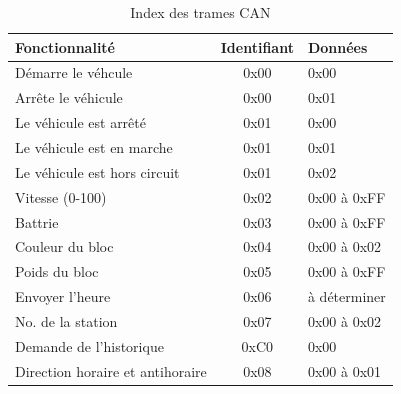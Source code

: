 \documentclass[10pt,a4paper,final]{article}
\begin{document}
\begin{spacing}{1.5}
\begin{table}[!ht]
\caption{Index des trames CAN}
\medskip
\centering
\begin{tabular}{|l|c|l|}
\hline 
\textbf{Fonctionnalité} & \textbf{Identifiant} & \textbf{Données} \\
\hline 
Démarre le véhcule & 0x00 & 0x00 \\ 
\hline 
Arrête le véhicule & 0x00 & 0x01 \\ 
\hline 
Le véhicule est arrêté & 0x01 & 0x00 \\ 
\hline 
Le véhicule est en marche& 0x01 & 0x01 \\ 
\hline 
Le véhicule est hors circuit & 0x01 & 0x02 \\ 
\hline 
Vitesse (0-100) & 0x02 & 0x00 à 0xFF \\ 
\hline 
Battrie & 0x03 & 0x00 à 0xFF \\ 
\hline 
Couleur du bloc & 0x04 & 0x00 à 0x02 \\ 
\hline 
Poids du bloc & 0x05 & 0x00 à 0xFF \\ 
\hline 
Envoyer l'heure & 0x06 & à déterminer \\ 
\hline 
No. de la station & 0x07 & 0x00 à 0x02 \\ 
\hline 
Demande de l'historique & 0xC0 & 0x00 \\ 
\hline 
Direction horaire et antihoraire & 0x08 & 0x00 à 0x01 \\
\hline
\end{tabular} 
\label{tab:testtab1}
\end{table}


\end{spacing}
\end{document}
